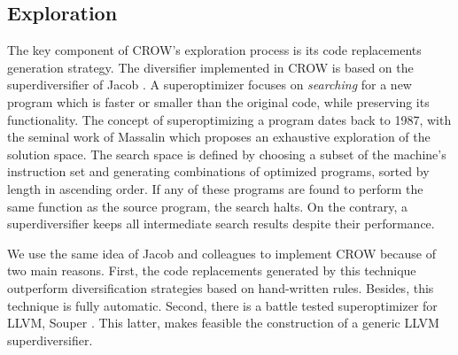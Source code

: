 
\subsection{Exploration}


The key component of CROW's exploration process is its code replacements generation strategy. The diversifier implemented in CROW is based on the superdiversifier of Jacob \etal \cite{jacob2008superdiversifier}.
A superoptimizer focuses on \emph{searching} for a new program which is faster or smaller than the original code, while preserving its functionality.
The concept of superoptimizing a program dates back to 1987, with the seminal work of Massalin \cite{Massalin1987} which proposes an exhaustive exploration of the solution space. The search space is defined by choosing a subset of the machine's instruction set and generating combinations of optimized programs, sorted by length in ascending order. If any of these programs are found to perform the same function as the source program, the search halts. On the contrary, a superdiversifier keeps all intermediate search results despite their performance. 

We use the same idea of Jacob and colleagues to implement CROW because of two main reasons.
First, the code replacements generated by this technique outperform diversification strategies based on hand-written rules. Besides, this technique is fully automatic.
Second, there is a battle tested superoptimizer for LLVM, Souper \cite{Sasnauskas2017Souper:Superoptimizer}. This latter, makes feasible the construction of a generic LLVM superdiversifier. 

